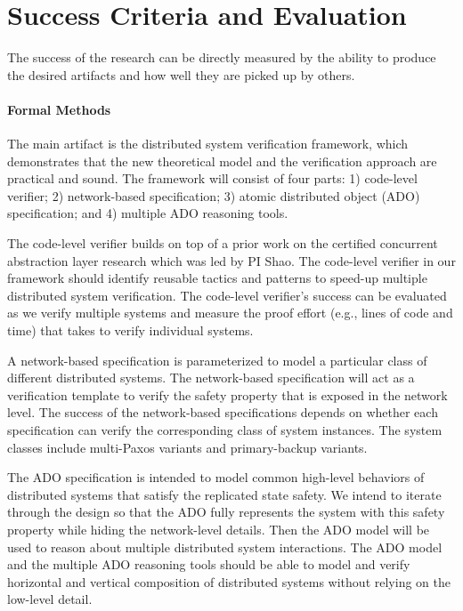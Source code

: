 \documentclass[11pt]{article}
\begin{document}
\section{Success Criteria and Evaluation}

The success of the research can be directly measured by the ability to produce the desired artifacts
and how well they are picked up by others.

\paragraph{Formal Methods} The main artifact is the distributed system verification framework, 
which demonstrates that the new theoretical model and the verification approach are practical and sound.
The framework will consist of four parts: 1) code-level verifier; 2) network-based specification;
3) atomic distributed object (ADO) specification; and 4) multiple ADO reasoning
tools. 

The code-level verifier builds on top of a prior work on the certified 
concurrent abstraction layer research which was led by PI Shao. The code-level 
verifier in our framework should identify reusable tactics and patterns to speed-up 
multiple distributed system verification. The code-level verifier's success can be
evaluated as we verify multiple systems and measure the proof effort (e.g., lines 
of code and time) that takes to verify individual systems. 

A network-based specification is parameterized to model a particular class of 
different distributed systems. The network-based specification will act as a verification 
template to verify the safety property that is exposed in the network level. 
The success of the network-based specifications depends on whether each
specification can verify the corresponding class of system instances.
The system classes include multi-Paxos variants and primary-backup variants.

The ADO specification is intended to model common high-level behaviors of distributed systems
that satisfy the replicated state safety. We intend to iterate through the design so that
the ADO fully represents the system with this safety property while hiding the network-level
details. Then the ADO model will be used to reason about multiple distributed system interactions. 
The ADO model and the multiple ADO reasoning tools should be able to model and verify
horizontal and vertical composition of distributed systems without relying on the low-level detail.
\end{document}
